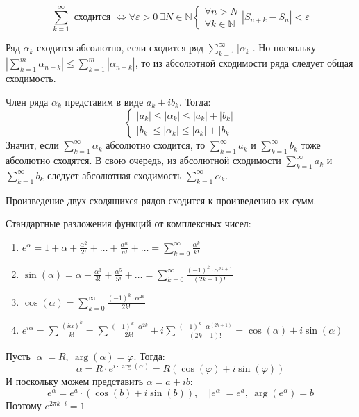 \begin{theorem*}
    \[\sum_{k=1}^{\infty} \text{ сходится } \iff \forall \varepsilon>0 \ \exists N \in \mathbb{N} \begin{cases*}
        \forall n > N \\
        \forall k \in \mathbb{N}
    \end{cases*} \left| S_{n+k} - S_n\right| < \varepsilon\]
\end{theorem*}

\begin{definition}
    Ряд $\alpha_k$ сходится абсолютно, если сходится ряд $\sum_{k = 1}^{\infty} \left| \alpha_k\right|$. Но поскольку $\left| \sum_{k = 1}^{m} \alpha_{n+k}\right| \leq \sum_{k=1}^{m}\left| \alpha_{n+k} \right|$, то из абсолютной сходимости ряда следует общая сходимость.
\end{definition}

\begin{statement}
    Член ряда $\alpha_k$ представим в виде $a_k + ib_k$. Тогда:
    \[\begin{cases*}
        \left| a_k \right| \leq \left|\alpha_k\right| \leq \left| a_k \right| + \left| b_k \right| \\
        \left| b_k \right| \leq \left|\alpha_k\right| \leq \left| a_k \right| + \left| b_k \right|
    \end{cases*}\]
    Значит, если $\sum_{k=1}^{\infty}\alpha_k$ абсолютно сходится, то $\sum_{k=1}^{\infty}a_k$ и  $\sum_{k=1}^{\infty}b_k$ тоже абсолютно сходятся. 
    В свою очередь, из абсолютной сходимости $\sum_{k=1}^{\infty}a_k$ и  $\sum_{k=1}^{\infty}b_k$ следует абсолютная сходимость $\sum_{k=1}^{\infty}\alpha_k$.
\end{statement}

\begin{definition}
    Произведение двух сходящихся рядов сходится к произведению их сумм.
\end{definition}

Стандартные разложения функций от комплексных чисел:
\begin{enumerate}
    \item $e^\alpha = 1 + \alpha + \frac{\alpha^2}{2!} + \hdots + \frac{\alpha^n}{n!} + \hdots = \sum_{k=0}^{\infty}\frac{\alpha^k}{k!}$
    \item $\sin(\alpha) = \alpha - \frac{\alpha^3}{3!} + \frac{\alpha^5}{5!} + \hdots = \sum_{k=0}^{\infty}\frac{(-1)^k\cdot\alpha^{2k+1}}{(2k+1)!}$
    \item $\cos(\alpha) = \sum_{k=0}^{\infty}\frac{(-1)^k\cdot\alpha^{2k}}{2k!}$
    \item $e^{i\alpha} = \sum\frac{(i\alpha)^k}{k!} = \sum\frac{(-1)^k\cdot\alpha^{2k}}{2k!} + i\sum\frac{(-1)^k\cdot\alpha^{(2k+1)}}{(2k+1)!} = \cos(\alpha) + i\sin(\alpha)$
\end{enumerate}

Пусть $\mid \alpha \mid = R, \ \arg(\alpha) = \varphi$. Тогда:
\[\alpha = R\cdot e^{i\cdot\arg(\alpha)} = R(\cos(\varphi) + i\sin(\varphi))\]
И поскольку можем представить $\alpha = a + ib$:
\[e^{\alpha} = e^a\cdot (\cos(b) + i\sin(b)), \quad \left| e^\alpha\right| = e^a, \ \arg(e^\alpha) = b\]
Поэтому $e^{2\pi k\cdot i} = 1$